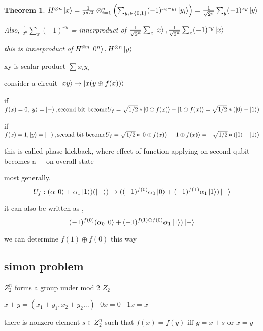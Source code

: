 \documentclass[10pt]{article}
\theoremstyle{break}
\newtheorem{thm}{Theorem}[subsection]
\begin{document}
         \begin{thm}
             $H^{\otimes n}\ket{x}=\frac{1}{2^{n/2}}\otimes^n_{i=1}\left(
                 \sum _{y_i\in\{0,1\}}(-1)^{x_i-y_i}\ket{y_i}
             \right)
                 =\frac{1}{\sqrt{2^n}}\sum_y(-1)^{xy}\ket{y}$

            
            Also, $\frac{1}{2^n}\sum_x(-1)^{xy}$ = innerproduct of 
            $\frac{1}{\sqrt{2^n}}\sum_x\ket{x},\frac{1}{\sqrt{2^n}}\sum_x(-1)^{xy}\ket{x}$

            this is innerproduct of $H^{\otimes n}\ket{0^n},H^{\otimes n}\ket{y}$

         \end{thm}

         xy is scalar product $\sum x_iy_i$

         consider a circuit $\ket{x y}\rightarrow \ket{x (y\oplus f(x))}$
         

         if $f(x)=0,\ket{y}=\ket{-}, \text{second bit become} \\ U_f=\sqrt{1/2}*\ket{0\oplus f(x)} - \ket{1\oplus f(x)} =
         \sqrt{1/2}*(\ket{0}-\ket{1}) $
    
         if $f(x)=1,\ket{y}=\ket{-}, \text{second bit become} \\ U_f=\sqrt{1/2}*\ket{0\oplus f(x)} - \ket{1\oplus f(x)} =
         -\sqrt{1/2}*(\ket{0}-\ket{1}) $

         this is called phase kickback, where effect of function applying on second qubit becomes a $\pm $ on overall state 

         most generally, 
         $$U_f:(\alpha\ket{0}+\alpha_1\ket{1})(\ket{-})\rightarrow
         ((-1)^{f(0)}\alpha_0\ket{0}+(-1)^{f(1)}\alpha_1\ket{1})\ket{-}$$

        it can also be written as , 
         $$ (-1)^{f(0)}(\alpha_0\ket{0}+(-1)^{f(1)\oplus f(0)}\alpha_1\ket{1})\ket{-}$$

         we can determine $f(1)\oplus f(0)$ this way


         \subsection{simon problem}

         $Z_2^n$ forms a group under mod 2 $Z_2$

         $x+y=(x_1+y_1, x_2+y_2 ...)~~~0x=0~~~~ 1x=x$

         there is nonzero element $s\in Z_2^n$ such that  
         $f(x)=f(y)$ iff $y=x+s$ or $x=y$ 
\end{document}
